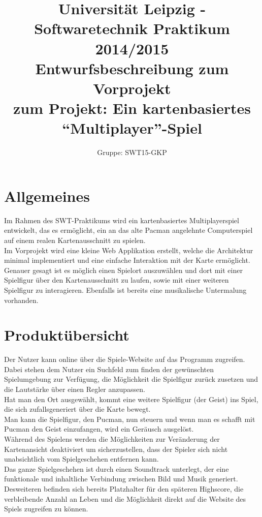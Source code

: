 \documentclass[11pt,a4paper]{article}
\author{Gruppe: SWT15-GKP}
\title{Universität Leipzig - Softwaretechnik Praktikum 2014/2015 \\  Entwurfsbeschreibung zum Vorprojekt \\ zum Projekt: Ein kartenbasiertes “Multiplayer”-Spiel}
\begin{document}
\maketitle

\clearpage

\tableofcontents

\clearpage

\flushleft
\section{Allgemeines}
Im Rahmen des SWT-Praktikums wird ein kartenbasiertes Multiplayerspiel entwickelt, das es ermöglicht, ein an das alte Pacman angelehnte Computerspiel auf einem realen Kartenausschnitt zu spielen. \\
Im Vorprojekt wird eine kleine Web Applikation erstellt, welche die Architektur minimal implementiert und eine einfache Interaktion mit der Karte ermöglicht.
Genauer gesagt ist es möglich einen Spielort auszuwählen und dort mit einer Spielfigur über den Kartenausschnitt zu laufen, sowie mit einer weiteren Spielfigur zu interagieren. Ebenfalls ist bereits eine musikalische Untermalung vorhanden.


\section{Produktübersicht}
Der Nutzer kann online über die Spiele-Website auf das Programm zugreifen.
Dabei stehen dem Nutzer ein Suchfeld zum finden der gewünschten Spielumgebung zur Verfügung, die Möglichkeit die Spielfigur zurück zusetzen und die Lautstärke über einen Regler anzupassen. \\
Hat man den Ort ausgewählt, kommt eine weitere Spielfigur (der Geist) ins Spiel, die sich zufallsgeneriert über die Karte bewegt. \\
Man kann die Spielfigur, den Pucman, nun steuern und wenn man es schafft mit Pucman den Geist einzufangen, wird ein Geräusch ausgelöst. \\
Während des Spielens werden die Möglichkeiten zur Veränderung der Kartenansicht deaktiviert um sicherzustellen, dass der Spieler sich nicht unabsichtlich vom Spielgeschehen entfernen kann. \\
Das ganze Spielgeschehen ist durch einen Soundtrack unterlegt, der eine funktionale und inhaltliche Verbindung zwischen Bild und Musik generiert. \\
Desweiteren befinden sich bereits Platzhalter für den späteren Highscore, die verbleibende Anzahl an Leben und die Möglichkeit direkt auf die Website des Spiels zugreifen zu können.
\clearpage
\end{document}
